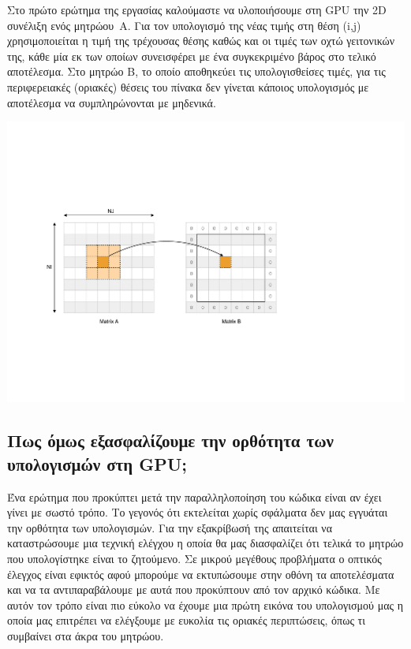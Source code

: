 \noindent Στο πρώτο ερώτημα της εργασίας καλούμαστε να υλοποιήσουμε στη GPU την 2D συνέλιξη ενός \mbox{μητρώου A}. Για τον υπολογισμό της νέας τιμής στη θέση (i,j) χρησιμοποιείται η τιμή της τρέχουσας θέσης καθώς και οι τιμές των οχτώ γειτονικών της, κάθε μία εκ των οποίων συνεισφέρει με ένα συγκεκριμένο βάρος στο τελικό αποτέλεσμα. Στο μητρώο Β, το οποίο αποθηκεύει τις υπολογισθείσες τιμές, για τις περιφερειακές (οριακές) θέσεις του πίνακα δεν γίνεται κάποιος υπολογισμός με αποτέλεσμα να συμπληρώνονται με μηδενικά.

\begin{center}
    \includegraphics[scale=0.8]{./figures/1_conv/2d_conv}
\end{center}

\vspace{-0.8cm}
\subsection*{Πως όμως εξασφαλίζουμε την ορθότητα των υπολογισμών στη GPU;}

Ένα ερώτημα που προκύπτει μετά την παραλληλοποίηση του κώδικα είναι αν έχει γίνει με σωστό τρόπο. Το γεγονός ότι εκτελείται χωρίς σφάλματα δεν μας εγγυάται την ορθότητα των υπολογισμών. Για την εξακρίβωσή της απαιτείται να καταστρώσουμε μια τεχνική ελέγχου η οποία θα μας διασφαλίζει ότι τελικά το μητρώο που υπολογίστηκε είναι το ζητούμενο. Σε μικρού μεγέθους προβλήματα ο οπτικός έλεγχος είναι εφικτός αφού μπορούμε να εκτυπώσουμε στην οθόνη τα αποτελέσματα και να τα αντιπαραβάλουμε με αυτά που προκύπτουν από τον αρχικό κώδικα. Με αυτόν τον τρόπο είναι πιο εύκολο να έχουμε μια πρώτη εικόνα του υπολογισμού μας η οποία μας επιτρέπει να ελέγξουμε με ευκολία τις οριακές περιπτώσεις, όπως τι συμβαίνει στα άκρα του μητρώου.

